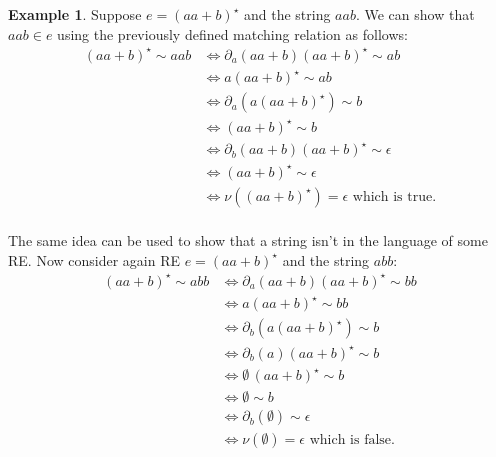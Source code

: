 \documentclass[review]{elsarticle}
\theoremstyle{definition}
\newtheorem{Example}{Example}
\begin{document}
\begin{Example}
    Suppose $e = (aa + b)^\star$ and the string $aab$. We can show that 
    $aab \in e$ using the previously defined matching relation as follows:
    \begin{align*}
        (aa + b)^\star \sim aab & \Leftrightarrow \partial_a (aa + b) (aa + b)^\star \sim ab \\
                                & \Leftrightarrow a(aa + b)^\star \sim ab \\
                                & \Leftrightarrow \partial_a(a(aa + b)^\star) \sim b \\
                                & \Leftrightarrow (aa + b)^\star \sim b \\
                                & \Leftrightarrow \partial_b(aa + b)(aa + b)^\star \sim \epsilon\\
                                & \Leftrightarrow (aa + b)^\star \sim \epsilon \\
                                & \Leftrightarrow \nu((aa + b)^\star) = \epsilon \text{ which is true.}\\ 
    \end{align*}
    
    The same idea can be used to show that a string isn't in the language of some RE. Now consider again
    RE $e = (aa + b)^\star$ and the string $abb$:
    \begin{align*}
        (aa + b)^\star \sim abb & \Leftrightarrow \partial_a (aa + b) (aa + b)^\star \sim bb \\
                                & \Leftrightarrow a(aa + b)^\star \sim bb \\
                                & \Leftrightarrow \partial_b (a(aa+ b)^\star) \sim b \\
                                & \Leftrightarrow \partial_b(a)(aa + b)^\star \sim b \\
                                & \Leftrightarrow \emptyset\,(aa + b)^\star \sim b   \\
                                & \Leftrightarrow \emptyset \sim b                   \\
                                & \Leftrightarrow \partial_b(\emptyset) \sim \epsilon \\
                                & \Leftrightarrow \nu(\emptyset) = \epsilon \text{ which is false.}\\
    \end{align*}    
\end{Example}    
\end{document}
